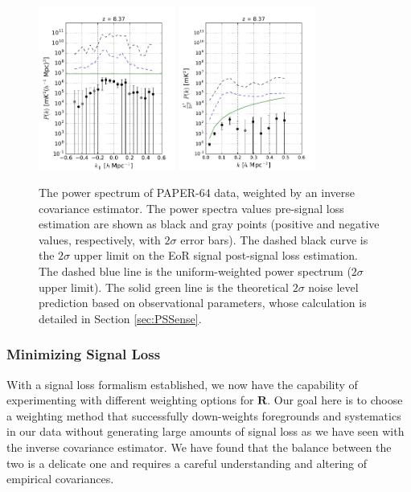 \documentclass[preprint2,numberedappendix,tighten]{aastex6}
\begin{document}
\begin{figure}
	\centering
	\includegraphics[width=0.4\textwidth]{plots/ps1_data.pdf}
	\includegraphics[width=0.4\textwidth]{plots/ps2_data.pdf}
	\caption{The power spectrum of PAPER-64 data, weighted by an inverse covariance estimator. The power spectra values pre-signal loss estimation are shown as black and gray points (positive and negative values, respectively, 
with $2\sigma$ error bars). The dashed black curve is the $2\sigma$ upper limit on the EoR signal post-signal loss estimation. The dashed blue line is the uniform-weighted power 
spectrum ($2\sigma$ upper limit). The solid green line is the theoretical $2\sigma$ noise level prediction based on observational 
parameters, whose calculation is detailed in Section \ref{sec:PSSense}.}
	\label{fig:ps2_data}
\end{figure}


\subsubsection{Minimizing Signal Loss}
\label{sec:Weight}

With a signal loss formalism established, we now have the capability of experimenting 
with different weighting options for $\textbf{R}$. Our goal here is to choose a weighting method that successfully down-weights 
foregrounds and systematics in our data without generating large amounts of signal loss as we have seen with the inverse covariance estimator. We have found that the balance 
between the two is a delicate one and requires a careful understanding and altering of empirical covariances. 
\end{document}
